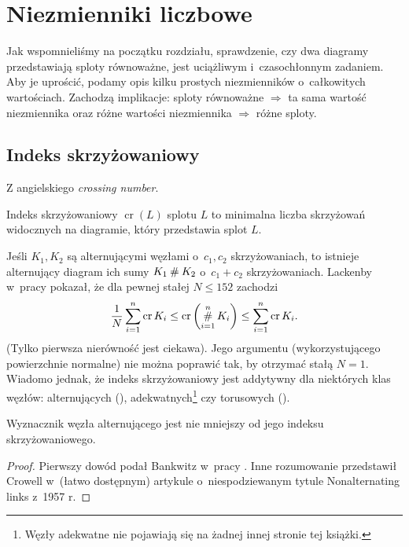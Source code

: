 \section{Niezmienniki liczbowe}
Jak wspomnieliśmy na początku rozdziału, sprawdzenie,
czy dwa diagramy przedstawiają sploty równoważne,
jest uciążliwym i~czasochłonnym zadaniem.
Aby je uprościć, podamy opis kilku prostych niezmienników o~całkowitych wartościach.
Zachodzą implikacje:
sploty równoważne $\Rightarrow$ ta sama wartość niezmiennika
oraz różne wartości niezmiennika $\Rightarrow$ różne sploty.

\subsection{Indeks skrzyżowaniowy} %
\label{sub:crossing_number}
Z angielskiego \emph{crossing number}.

\begin{definition}
    Indeks skrzyżowaniowy $\operatorname{cr}(L)$ splotu $L$ to
    minimalna liczba skrzyżowań widocznych na diagramie,
    który przedstawia splot $L$.
\end{definition}

Jeśli $K_1, K_2$ są alternującymi węzłami o~$c_1, c_2$ skrzyżowaniach, to istnieje alternujący diagram ich sumy $K_1 \mathbin{\#} K_2$ o~$c_1 + c_2$ skrzyżowaniach.
Lackenby w~pracy \cite{lackenby09} pokazał, że dla pewnej stałej $N \le 152$ zachodzi
\[
    \frac 1 N \sum_{i=1}^n \operatorname{cr} K_i \le \operatorname{cr} \left(\operatorname*{\#}_{i=1}^n K_i\right) \le \sum_{i=1}^n \operatorname{cr} K_i.
\]
(Tylko pierwsza nierówność jest ciekawa).
Jego argumentu (wykorzystującego powierzchnie normalne) nie można poprawić tak, by otrzymać stałą $N = 1$.
Wiadomo jednak, że indeks skrzyżowaniowy jest addytywny dla niektórych klas węzłów: alternujących (\cite{kauffman88}), adekwatnych\footnote{Węzły adekwatne nie pojawiają się na żadnej innej stronie tej książki.} czy torusowych (\cite{gruber03}).

\begin{theorem}[Bankwitz, 1930] \label{thm:bankwitz}
	Wyznacznik węzła alternującego jest nie mniejszy od jego indeksu skrzyżowaniowego.
\end{theorem}

\begin{proof}
	Pierwszy dowód podał Bankwitz w~pracy \cite{bankwitz30}.
	Inne rozumowanie przedstawił Crowell w~(łatwo dostępnym) artykule o~niespodziewanym tytule Nonalternating links z~1957 r.
\end{proof}

